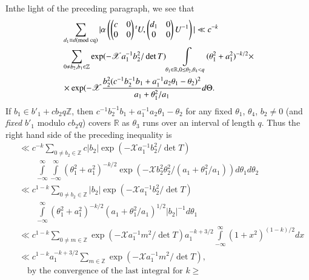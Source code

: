 \setcounter{proofofprop}{13}
\begin{proofofprop}\label{c1:proofofprop-1.4.14}
In\pageoriginale the light of the preceding paragraph, we see that
\begin{align*}
& \sum_{d_{1}\equiv d(\rm{mod} \; cq)}|\alpha\left(
\begin{pmatrix}
c & 0\\
 0 & 0
\end{pmatrix}{}^{t}U,
\begin{pmatrix}
d_{1} & 0\\
0 & 0
\end{pmatrix}
U^{-1}\right)|\ll c^{-k}\\
&\sum_{0\neq
  b_{2},b_{1}\in\mathbb{Z}}\exp(-\mathscr{X}a^{-1}_{1}b^{2}_{2}/\det
T)\int\limits_{\theta_{1}\in\mathbb{R},0\leq
  \theta_{2},\theta_{4}<q}(\theta^{2}_{1}+a^{2}_{1})^{-k/2}\times\\
&\times \exp(-\mathscr{X}\frac{b^{2}_{2}(c^{-1}b^{-1}_{2}b_{1}+a^{-1}_{1}a_{2}\theta_{1}-\theta_{2})^{2}}{a_{1}+\theta^{2}_{1}/a_{1}}d\Theta.
\end{align*}
If $b_{1}\in b'_{1}+cb_{2}q\mathbb{Z}$, then
$c^{-1}b^{-1}_{2}b_{1}+a^{-1}_{1}a_{2}\theta_{1}-\theta_{2}$ for any
fixed $\theta_{1}$, $\theta_{4}$, $b_{2}\neq 0$ (and {\em fixed}
$b'_{1}$ modulo $cb_{2}q$) covers $\mathbb{R}$ as $\theta_{3}$ runs
over an interval of length $q$. Thus the right hand side of the
preceding inequality is
\begin{align*}
&\ll c^{-k}\sum_{0\neq
    b_{2}\in\mathbb{Z}}c|b_{2}|\exp(-\mathscr{X}a^{-1}_{1}b^{2}_{2}/\det
  T)\\
&\qquad \int\limits^{\infty}_{-\infty}\int\limits^{\infty}_{-\infty}(\theta^{2}_{1}+a^{2}_{1})^{-k/2}\exp(-\mathscr{X}b^{2}_{2}\theta^{2}_{2}/(a_{1}+\theta^{2}_{1}/a_{1}))d\theta_{1}d\theta_{2}\\
&\ll c^{1-k}\sum_{0\neq
    b_{2}\in\mathbb{Z}}|b_{2}|\exp(-\mathscr{X}a^{-1}_{1}b^{2}_{2}/\det
  T)\\
&\qquad \int\limits^{\infty}_{-\infty}(\theta^{2}_{1}+a^{2}_{1})^{-k/2}(a_{1}+\theta^{2}_{1}/a_{1})^{1/2}|b_{2}|^{-1}d\theta_{1}\\
&\ll c^{1-k}\sum_{0\neq
    m\in\mathbb{Z}}\exp(-\mathscr{X}a^{-1}_{1}m^{2}/\det
  T)a^{-k+3/2}_{1}\int\limits^{\infty}_{-\infty}(1+x^{2})^{(1-k)/2}dx\\
&\ll
  c^{1-k}a^{-k+3/2}_{1}\sum_{m\in\mathbb{Z}}\exp(-\mathscr{X}a^{-1}_{1}m^{2}/\det
  T),\\
&\quad \text{by the convergence of the last integral for } k\geq

\end{align*}
\end{proofofprop}
